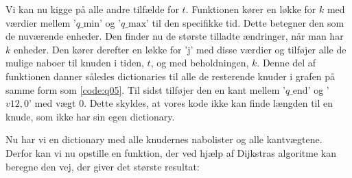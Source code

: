 Vi kan nu kigge på alle andre tilfælde for $t$. Funktionen kører en løkke for $k$ med værdier mellem '$q\textrm{\_min}$' og '$q\textrm{\_max}$' til den specifikke tid. Dette betegner den som de nuværende enheder.
Den finder nu de største tilladte ændringer, når man har $k$ enheder. Den kører derefter en løkke for 'j' med disse værdier og tilføjer alle de mulige naboer til knuden i tiden, $t$, og med beholdningen, $k$. Denne del af funktionen danner således dictionaries til alle de resterende knuder i grafen på samme form som \autoref{code:q05}.
Til sidst tilføjer den en kant mellem '$q\textrm{\_end}$' og '$v12,0$' med vægt $0$. Dette skyldes, at vores kode ikke kan finde længden til en knude, som ikke har sin egen dictionary.

Nu har vi en dictionary med alle knudernes nabolister og alle kantvægtene. Derfor kan vi nu opstille en funktion, der ved hjælp af Dijkstras algoritme kan beregne den vej, der giver det største resultat:




